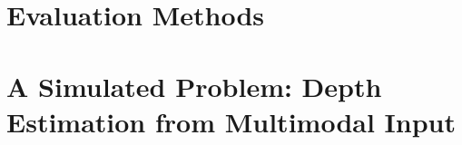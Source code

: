 \section{Evaluation Methods}



\section{A Simulated Problem: Depth Estimation from Multimodal Input}



